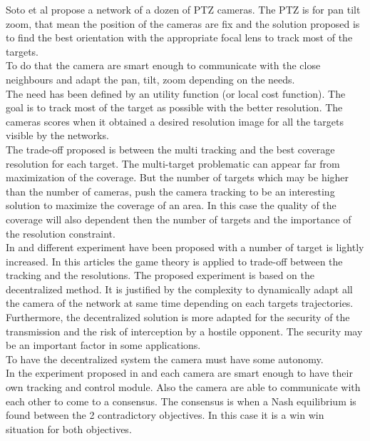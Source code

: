 Soto et al \cite{12*soto2009} propose a network of a dozen of PTZ cameras. The PTZ is for pan tilt zoom, that mean the position of the cameras are fix and the solution proposed is to find the best orientation with the appropriate focal lens to track most of the targets.  \\
 To do that the camera are smart enough to communicate with the close neighbours and adapt the pan, tilt, zoom depending on the needs.\\
The need has been defined by an utility function (or local cost function). The goal is to track most of the target as possible with the better resolution. The cameras scores when it obtained a desired resolution image for all the targets visible by the networks.\\
The trade-off proposed is between the multi tracking and the best coverage resolution for each target. The multi-target problematic can appear far from maximization of the coverage. But the number of targets  which may be higher than the number of cameras, push the camera tracking to be an interesting solution to maximize the coverage of an area. In this case the quality of the coverage will also dependent then the number of targets and the importance of the resolution constraint.  \\
	 In \cite{18*ding2012} and \cite{25*song2008} different experiment have been proposed with a number of target is lightly increased.  In this articles the game theory is applied to trade-off between the tracking and the resolutions. The proposed experiment is based on the decentralized method. It is justified by the complexity to dynamically adapt all the camera of the network at same time depending on each targets trajectories.\\
	  Furthermore, the decentralized solution is more adapted for the security of the transmission and the risk of interception by a hostile opponent. The security may be an important factor in some applications. \\
To have the decentralized system the camera must have some autonomy. \\
In the experiment proposed in \cite{12*soto2009} and \cite{18*ding2012,25*song2008}  each camera are smart enough to have their own tracking  and control module. Also the camera are able to communicate with each other to come to a consensus. The consensus is when a Nash equilibrium is found between the 2 contradictory objectives. In this case it is a win win situation for both objectives.\\
